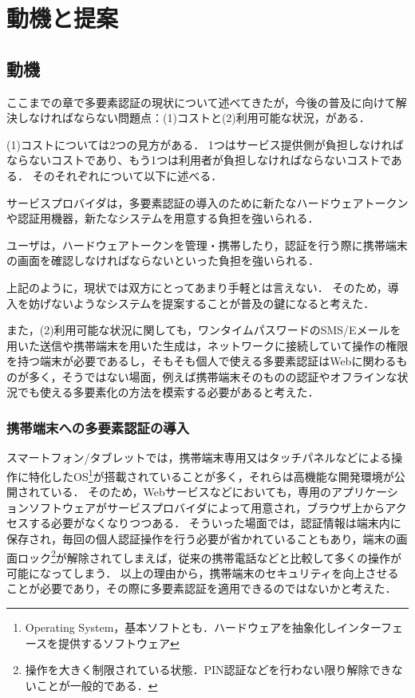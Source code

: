 \chapter{動機と提案}\label{chap:motive}
\section{動機}
ここまでの章で多要素認証の現状について述べてきたが，今後の普及に向けて解決しなければならない問題点：(1)コストと(2)利用可能な状況，がある．

(1)コストについては2つの見方がある．
1つはサービス提供側が負担しなければならないコストであり、もう1つは利用者が負担しなければならないコストである．
そのそれぞれについて以下に述べる．

サービスプロバイダは，多要素認証の導入のために新たなハードウェアトークンや認証用機器，新たなシステムを用意する負担を強いられる．

ユーザは，ハードウェアトークンを管理・携帯したり，認証を行う際に携帯端末の画面を確認しなければならないといった負担を強いられる．

上記のように，現状では双方にとってあまり手軽とは言えない．
そのため，導入を妨げないようなシステムを提案することが普及の鍵になると考えた．

また，(2)利用可能な状況に関しても，ワンタイムパスワードのSMS/Eメールを用いた送信や携帯端末を用いた生成は，ネットワークに接続していて操作の権限を持つ端末が必要であるし，そもそも個人で使える多要素認証はWebに関わるものが多く，そうではない場面，例えば携帯端末そのものの認証やオフラインな状況でも使える多要素化の方法を模索する必要があると考えた．

\subsection{携帯端末への多要素認証の導入}
スマートフォン/タブレットでは，携帯端末専用又はタッチパネルなどによる操作に特化したOS\footnote{Operating System，基本ソフトとも．ハードウェアを抽象化しインターフェースを提供するソフトウェア}が搭載されていることが多く，それらは高機能な開発環境が公開されている．
そのため，Webサービスなどにおいても，専用のアプリケーションソフトウェアがサービスプロバイダによって用意され，ブラウザ上からアクセスする必要がなくなりつつある．
そういった場面では，認証情報は端末内に保存され，毎回の個人認証操作を行う必要が省かれていることもあり，端末の画面ロック\footnote{操作を大きく制限されている状態．PIN認証などを行わない限り解除できないことが一般的である．}が解除されてしまえば，従来の携帯電話などと比較して多くの操作が可能になってしまう．
以上の理由から，携帯端末のセキュリティを向上させることが必要であり，その際に多要素認証を適用できるのではないかと考えた．

